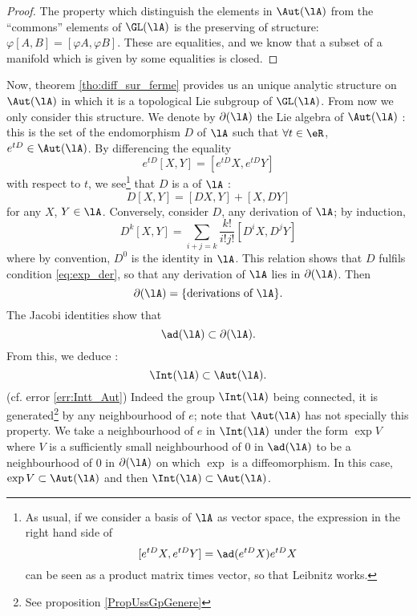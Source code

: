 \begin{proof}
The property which distinguish the elements in $\Aut(\lA)$ from the ``commons'' elements of $\GL(\lA)$ is the preserving of structure: $\varphi[A,B]=[\varphi A,\varphi B]$. These are equalities, and we know that a subset of a manifold which is given by some equalities is closed.
\end{proof}

Now, theorem \ref{tho:diff_sur_ferme} provides us an unique analytic structure on $\Aut(\lA)$ in which it is a topological Lie subgroup of $\GL(\lA)$. From now we only consider this structure. We denote by $\partial(\lA)$ the Lie algebra of $\Aut(\lA)$ : this is the set of the endomorphism $D$ of $\lA$ such that $\forall t\in\eR$, $e^{tD}\in\Aut(\lA)$. By differencing the equality
\begin{equation}\label{eq:exp_der}
  e^{tD}[X,Y]=[e^{tD}X,e^{tD}Y]
\end{equation}
with respect to $t$, we see\footnote{As usual, if we consider a basis of $\lA$ as vector space, the expression in the right hand side of \[[e^{tD}X,e^{tD}Y]=\ad(e^{tD}X)e^{tD}X\] can be seen as a product matrix times vector, so that Leibnitz works.} that $D$ is a  of $\lA$ :
\begin{equation}
  D[X,Y]=[DX,Y]+[X,DY]
\end{equation}
for any $X$, $Y\in\lA$. Conversely, consider $D$, any derivation of $\lA$; by induction, 
\begin{equation}
   D^k[X,Y]=\sum_{i+j=k}\frac{k!}{i!j!}[D^iX,D^jY]
\end{equation}
where by convention, $D^0$ is the identity in $\lA$. This relation shows that $D$ fulfils condition \eqref{eq:exp_der}, so that any derivation of $\lA$ lies in $\partial(\lA)$. Then
\[
  \partial(\lA)=\{\text{derivations of $\lA$}\}.
\]
The Jacobi identities show that 
\[
\ad(\lA)\subset\partial(\lA).    \label{pg:ad_subset_der}
\]
From this, we deduce :
\begin{equation}\label{eq:int_sub_aut}
  \Int(\lA)\subset\Aut(\lA).
\end{equation}
(cf. error \ref{err:Intt_Aut}) Indeed the group $\Int(\lA)$ being connected, it is generated\footnote{See proposition \ref{PropUssGpGenere}} by any neighbourhood of $e$; note that $\Aut(\lA)$ has not specially this property. We take a neighbourhood of $e$ in $\Int(\lA)$ under the form  $\exp V$  where $V$ is a sufficiently small neighbourhood of $0$ in $\ad(\lA)$ to be a neighbourhood of $0$ in $\partial(\lA)$ on which $\exp$ is a diffeomorphism. In this case, $\exp V\subset\Aut(\lA)$ and then $\Int(\lA)\subset\Aut(\lA)$.

